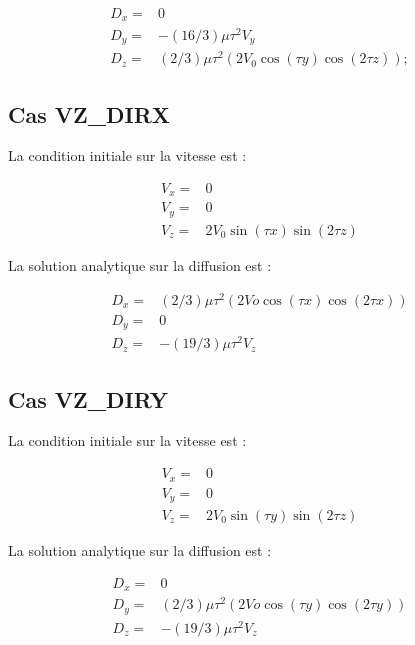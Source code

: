 \begin{align*}
D_x ={}& 0 \\
D_y ={}& -(16/3) \mu \tau^2 V_y \\
D_z ={}& (2/3) \mu \tau^2 (2V_0 \cos(\tau y) \cos(2 \tau z)) ;
\end{align*}

\subsection{Cas VZ\_DIRX}

La condition initiale sur la vitesse est :

\begin{align*}
V_x ={}& 0 \\
V_y ={}& 0 \\
V_z ={}& 2 V_0 \sin(\tau x) \sin(2 \tau z)
\end{align*}

La solution analytique sur la diffusion est :

\begin{align*}
D_x ={}& (2/3) \mu \tau^2 (2Vo \cos(\tau x) \cos(2 \tau x)) \\
D_y ={}& 0 \\
D_z ={}& -(19/3) \mu \tau^2 V_z
\end{align*}

\subsection{Cas VZ\_DIRY}

La condition initiale sur la vitesse est :

\begin{align*}
V_x ={}& 0 \\
V_y ={}& 0 \\
V_z ={}& 2 V_0 \sin(\tau y) \sin(2 \tau z)
\end{align*}

La solution analytique sur la diffusion est :

\begin{align*}
D_x ={}& 0 \\
D_y ={}& (2/3) \mu \tau^2 (2Vo \cos(\tau y) \cos(2 \tau y)) \\
D_z ={}& -(19/3) \mu \tau^2 V_z
\end{align*}

